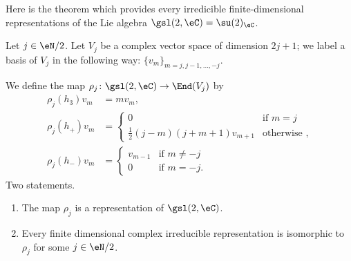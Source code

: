 Here is the theorem which provides every irredicible finite-dimensional representations of the Lie algebra \( \gsl(2,\eC)=\su(2)_{\eC}\).
\begin{theorem}     \label{THOooSRQYooXQDZpT}
    Let \( j\in \eN/2\). Let \( V_j\) be a complex vector space of dimension \( 2j+1\); we label a basis of \( V_j\) in the following way: \( \{ v_m \}_{m=j,j-1,\ldots, -j}\).

    We define the map \( \rho_j\colon \gsl(2,\eC)\to \End(V_j)\) by
    \begin{subequations}
        \begin{align}
            \rho_j(h_3)v_m&=mv_m,\\
            \rho_j(h_+)v_m&=\begin{cases}
                0    &   \text{if } m=j\\
                \frac{ 1 }{2}(j-m)(j+m+1)v_{m+1}    &    \text{otherwise },
            \end{cases}\\
            \rho_j(h_-)v_m&=\begin{cases}
                v_{m-1}    &   \text{if } m\neq -j\\
                0    &    \text{if } m=-j.
            \end{cases}
        \end{align}
    \end{subequations}
    Two statements.
    \begin{enumerate}
        \item
            The map \( \rho_j\) is a representation of \( \gsl(2,\eC)\).
        \item
            Every finite dimensional complex irreducible representation is isomorphic to \( \rho_j\) for some \( j\in \eN/2\).
    \end{enumerate}
\end{theorem}

